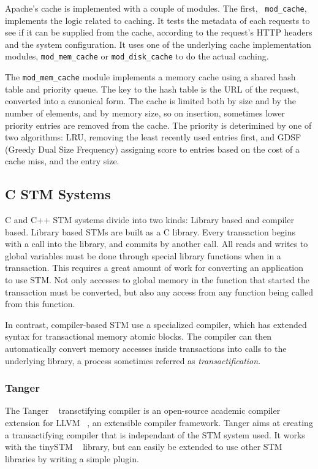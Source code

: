 \documentclass[preprint,natbib,11pt]{sigplanconf}
\begin{document}
Apache's cache is implemented with a couple of modules. The first, {\tt
mod\_cache}\cite{apache:mod_cache}, implements the logic related to caching. It
tests the metadata of each requests to see if it can be supplied from the cache,
according to the request's HTTP headers and the system configuration. It uses
one of the underlying cache implementation modules, {\tt mod\_mem\_cache} or
{\tt mod\_disk\_cache}\cite{apache:mod_disk_cache} to do the actual caching.

The {\tt mod\_mem\_cache} module implements a memory cache using a shared hash
table and priority queue. The key to the hash table is the URL of the request,
converted into a canonical form. The cache is limited both by size and by the
number of elements, and by memory size, so on insertion, sometimes lower
priority entries are removed from the cache. The priority is deterimined by one
of two algorithms: LRU, removing the least recently used entries first, and GDSF
(Greedy Dual Size Frequency) assigning score to entries based on the cost of a
cache miss, and the entry size.

\subsection{C STM Systems}
C and C++ STM systems divide into two kinds: Library based and compiler based.
Library based STMs are built as a C library. Every transaction begins with a
call into the library, and commits by another call. All reads and writes to
global variables must be done through special library functions when in a
transaction. This requires a great amount of work for converting an application
to use STM. Not only accesses to global memory in the function that started the
transaction must be converted, but also any access from any function being
called from this function. 

In contrast, compiler-based STM use a specialized compiler, which has extended
syntax for transactional memory atomic blocks. The compiler can then
automatically convert memory accesses inside transactions into calls to the
underlying library, a process sometimes referred as \emph{transactification}. 

\subsubsection{\sc Tanger}
The {\sc Tanger} ~\cite{felber2007tanger} transctifying compiler is an
open-source academic compiler extension for LLVM ~\cite{LLVM:CGO04}, an
extensible compiler framework.  Tanger aims at creating a transactifying
compiler that is independant of the STM system used. It works with the tinySTM
~\cite{felber2008tinystm} library, but can easily be extended to use other STM
libraries by writing a simple plugin.
\end{document}
